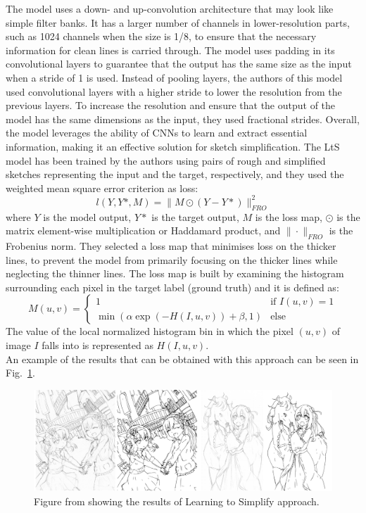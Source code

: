 \noindent The model uses a down- and up-convolution architecture that may look like simple filter banks. It has a larger number of channels in lower-resolution parts, such as \num{1024} channels when the size is \num{1}/\num{8}, to ensure that the necessary information for clean lines is carried through. The model uses padding in its convolutional layers to guarantee that the output has the same size as the input when a stride of \num{1} is used. Instead of pooling layers, the authors of this model used convolutional layers with a higher stride to lower the resolution from the previous layers. To increase the resolution and ensure that the output of the model has the same dimensions as the input, they used fractional strides.
Overall, the model leverages the ability of CNNs to learn and extract essential information, making it an effective solution for sketch simplification.
The LtS model has been trained by the authors using pairs of rough and simplified sketches representing the input and the target, respectively, and they used the weighted mean square error criterion as loss:
\begin{equation}
    l(Y,Y*,M)=\|M \odot (Y-Y*)\|^2_{FRO}
\end{equation}
where $Y$ is the model output, $Y*$ is the target output, $M$ is the loss map,  $\odot$ is the matrix element-wise multiplication or Haddamard product, and $\| \cdot \|_{FRO}$ is the Frobenius norm. They selected a loss map that minimises loss on the thicker lines, to prevent the model from primarily focusing on the thicker lines while neglecting the thinner lines. The loss map is built by examining the histogram surrounding each pixel in the target label (ground truth) and it is  defined as:
\begin{equation}
    M(u,v) = 
    \begin{cases}
        1 & \text{if } I(u,v)=1\\
        \min (\alpha \exp (-H(I,u,v)) + \beta, 1) & \text{else}
    \end{cases}
\end{equation}
The value of the local normalized histogram bin in which the pixel $(u,v)$ of image $I$ falls into is represented as $H(I,u,v)$.\\
An example of the results that can be obtained with this approach can be seen in Fig.~\ref{fig:Learning to Simplify results}.
%
\begin{figure}[htbp]
\centering
  \includegraphics[scale=0.35]{figures/learnToSimplify-results-paper.png}
  \caption{Figure from \cite{SketchSimplify} showing the results of Learning to Simplify approach.}
  \label{fig:Learning to Simplify results}
\end{figure}
%
